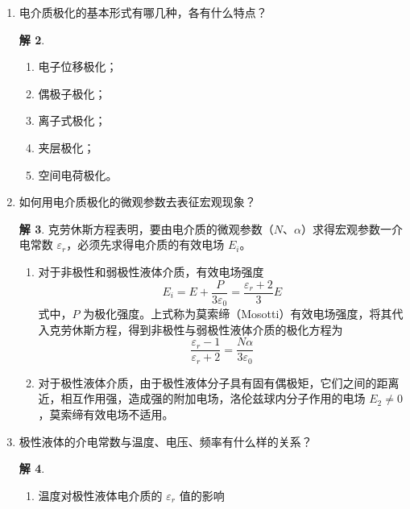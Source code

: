 \documentclass[zihao=-4,fontset = none]{ctexart}
\theoremstyle{definition}
\newtheorem*{solution}{解}
\begin{document}
\begin{enumerate}
\begin{solution}
\begin{enumerate}
\begin{enumerate}
        在较低温度下，采用了消除边缘效应的电极装置等严格控制的条件下，进行击穿试验时出现的一种击穿现象。
        \item 不均匀介质局部放电引起击穿
        
        从耐电强度低的气体开始，表现为局部放电，然后或快或慢地随时间发展至固体介质劣化损伤逐步扩大，致使介质击穿。
      \end{enumerate}
    \end{enumerate}
  \end{solution}
  \item 电介质极化的基本形式有哪几种，各有什么特点？
  \begin{solution}
    \begin{enumerate}
      \item 电子位移极化；
      \item 偶极子极化；
      \item 离子式极化；
      \item 夹层极化；
      \item 空间电荷极化。
    \end{enumerate}
  \end{solution}
  \item 如何用电介质极化的微观参数去表征宏观现象？
  \begin{solution}
    克劳休斯方程表明，要由电介质的微观参数（$N$、$\alpha$）求得宏观参数一介电常数 $\varepsilon_r$，必须先求得电介质的有效电场 $E_i$。
    \begin{enumerate}
      \item 对于非极性和弱极性液体介质，有效电场强度
      \[ E_i = E + \frac{P}{3\varepsilon_0} = \frac{\varepsilon_r + 2}{3} E \]
      式中，$P$ 为极化强度。上式称为莫索缔（Mosotti）有效电场强度，将其代入克劳休斯方程，得到非极性与弱极性液体介质的极化方程为
      \[ \frac{\varepsilon_r - 1}{\varepsilon_r + 2} = \frac{N \alpha}{3 \varepsilon_0} \]
      \item 对于极性液体介质，由于极性液体分子具有固有偶极矩，它们之间的距离近，相互作用强，造成强的附加电场，洛伦兹球内分子作用的电场 $E_2 \ne 0$，莫索缔有效电场不适用。
    \end{enumerate}
  \end{solution}
  \item 极性液体的介电常数与温度、电压、频率有什么样的关系？
  \begin{solution}
    \begin{enumerate}
      \item 温度对极性液体电介质的 $\varepsilon_r$ 值的影响
      

\end{enumerate}
\end{solution}
\end{enumerate}
\end{document}
